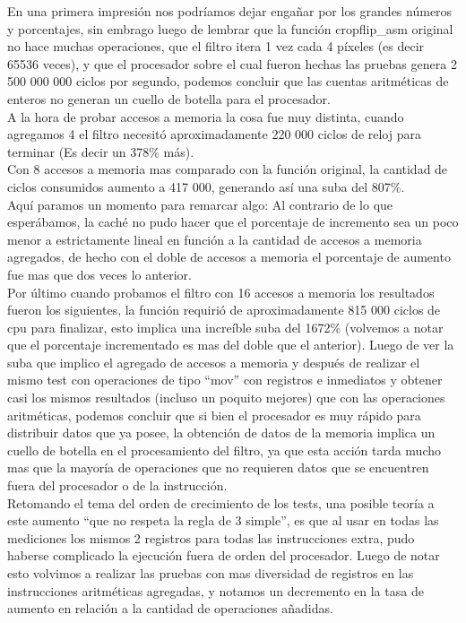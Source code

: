 \documentclass[a4paper]{article}
\begin{document}
En una primera impresi\'{o}n nos podríamos dejar engañar por los grandes números y porcentajes, sin embrago luego de lembrar que la funci\'{o}n cropflip_asm original no hace muchas operaciones, que el filtro itera 1 vez cada 4 píxeles (es decir 65536 veces), y que el procesador sobre el cual fueron hechas las pruebas genera 2 500 000 000 ciclos por segundo, podemos concluir que las cuentas aritméticas de enteros no generan un cuello de botella para el procesador. \\
A la hora de probar accesos a memoria la cosa fue muy distinta, cuando agregamos 4 el filtro necesit\'{o} aproximadamente 220 000 ciclos de reloj para terminar (Es decir un 378\% más). \\ Con 8 accesos a memoria mas comparado con la funci\'{o}n original, la cantidad de ciclos consumidos aumento a 417 000, generando así una suba del 807\%. \\ Aquí paramos un momento para remarcar algo: Al contrario de lo que esper\'{a}bamos, la cach\'{e} no pudo hacer que el porcentaje de incremento sea un poco menor a estrictamente lineal en funci\'{o}n a la cantidad de accesos a memoria agregados, de hecho con el doble de accesos a memoria el porcentaje de aumento fue mas que dos veces lo anterior. \\ Por \'{u}ltimo cuando probamos el filtro con 16 accesos a memoria los resultados fueron los siguientes, la función requirió de aproximadamente 815 000 ciclos de cpu para finalizar, esto implica una incre\'{i}ble suba del 1672\% (volvemos a notar que el porcentaje incrementado es mas del doble que el anterior). Luego de ver la suba que implico el agregado de accesos a memoria y después de realizar el mismo test con operaciones de tipo “mov” con registros e inmediatos y obtener casi los mismos resultados (incluso un poquito mejores) que con las operaciones aritméticas, podemos concluir que si bien el procesador es muy r\'{a}pido para distribuir datos que ya posee, la obtención de datos de la memoria implica un cuello de botella en el procesamiento del filtro, ya que esta acción tarda mucho mas que la mayoría de operaciones que no requieren datos que se encuentren fuera del procesador o de la instrucción. \\
Retomando el tema del orden de crecimiento de los tests, una posible teoría a este aumento “que no respeta la regla de 3 simple”, es que al usar en todas las mediciones los mismos 2 registros para todas las instrucciones extra, pudo haberse complicado la ejecución fuera de orden del procesador. Luego de notar esto volvimos a realizar las pruebas con mas diversidad de registros en las instrucciones aritméticas agregadas, y notamos un decremento en la tasa de aumento en relación a la cantidad de operaciones añadidas. \\ \\ \\ \\
\end{document}
